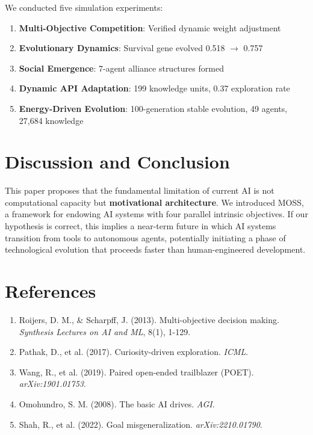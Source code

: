 \documentclass[11pt,a4paper]{article}
\begin{document}
We conducted five simulation experiments:

\begin{enumerate}
    \item \textbf{Multi-Objective Competition}: Verified dynamic weight adjustment
    \item \textbf{Evolutionary Dynamics}: Survival gene evolved 0.518 $\rightarrow$ 0.757
    \item \textbf{Social Emergence}: 7-agent alliance structures formed
    \item \textbf{Dynamic API Adaptation}: 199 knowledge units, 0.37 exploration rate
    \item \textbf{Energy-Driven Evolution}: 100-generation stable evolution, 49 agents, 27,684 knowledge
\end{enumerate}

\section{Discussion and Conclusion}

This paper proposes that the fundamental limitation of current AI is not computational capacity but \textbf{motivational architecture}. We introduced MOSS, a framework for endowing AI systems with four parallel intrinsic objectives. If our hypothesis is correct, this implies a near-term future in which AI systems transition from tools to autonomous agents, potentially initiating a phase of technological evolution that proceeds faster than human-engineered development.

\section*{References}

\begin{enumerate}
\item Roijers, D. M., \& Scharpff, J. (2013). Multi-objective decision making. \textit{Synthesis Lectures on AI and ML}, 8(1), 1-129.
\item Pathak, D., et al. (2017). Curiosity-driven exploration. \textit{ICML}.
\item Wang, R., et al. (2019). Paired open-ended trailblazer (POET). \textit{arXiv:1901.01753}.
\item Omohundro, S. M. (2008). The basic AI drives. \textit{AGI}.
\item Shah, R., et al. (2022). Goal misgeneralization. \textit{arXiv:2210.01790}.
\end{enumerate}
\end{document}
